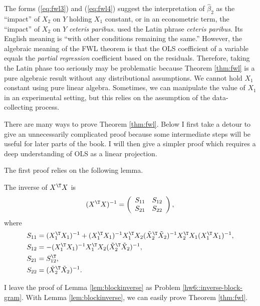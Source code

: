 The forms (\ref{eq:fwl3}) and (\ref{eq:fwl4}) suggest the interpretation of
$\hat{\beta}_{2}$ as the ``impact'' of $X_{2}$ on $Y$ holding $X_{1}$
constant, or in an econometric term, the ``impact'' of $X_{2}$ on
$Y$ \emph{ceteris paribus}. \citet{marshall1890principles} used the Latin phrase \emph{ceteris paribus}. Its English meaning is ``with other conditions remaining the same.'' 
However, the algebraic meaning of the FWL theorem is that the OLS coefficient of a variable equals the {\it partial regression} coefficient based on the residuals. 
Therefore, taking the Latin phase too
seriously may be problematic because Theorem \ref{thm:fwl} is a pure algebraic
result without any distributional assumptions. We cannot hold $X_{1}$
constant using pure linear algebra. Sometimes, we can manipulate the value
of $X_{1}$ in an experimental setting, but this relies on the assumption of the data-collecting process. 

There are many ways to prove Theorem \ref{thm:fwl}. Below I first take
a detour to give an unnecessarily complicated proof because some intermediate
steps will be useful for later parts of the book. I will then give a
simpler proof which requires a deep understanding of OLS as a linear projection. 


The first proof relies on the following lemma. 

\begin{lemma}
\label{lem:blockinverse}The inverse of $X^{\T}X$ is
\[
(X^{\T}X)^{-1}=\left(\begin{array}{cc}
 S_{11}  &  S_{12} \\
 S_{21}  &  S_{22} 
\end{array}\right),
\]
 where 
\begin{align*}
 S_{11}  & =(X_{1}^{\T}X_{1})^{-1}+(X_{1}^{\T}X_{1})^{-1}X_{1}^{\T}X_{2}(\tilde{X}_{2}^{\T}\tilde{X}_{2})^{-1}X_{2}^{\T}X_{1}(X_{1}^{\T}X_{1})^{-1},\\
 S_{12}  & =-(X_{1}^{\T}X_{1})^{-1}X_{1}^{\T}X_{2}(\tilde{X}_{2}^{\T}\tilde{X}_{2})^{-1},\\
 S_{21}  & = S_{12}^{\T},\\
 S_{22}  & =(\tilde{X}_{2}^{\T}\tilde{X}_{2})^{-1}.
\end{align*}
\end{lemma}




I leave the proof of Lemma \ref{lem:blockinverse} as Problem \ref{hw6::inverse-block-gram}. With Lemma \ref{lem:blockinverse}, we can easily prove Theorem \ref{thm:fwl}.


